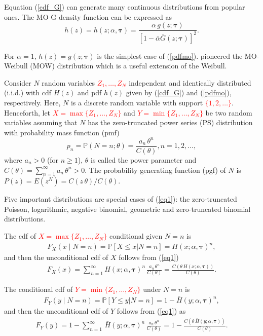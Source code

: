 \documentclass[12pt]{article}
\begin{document}
Equation (\ref{cdf_G}) can generate many continuous distributions from popular ones.
The MO-G density function can be expressed as
\begin{equation}\label{pdfmo}
h(z)=h(z;\alpha,\bm{\tau})=\frac{\alpha\, g(z;\bm{\tau})}{[1-\bar{\alpha}\bar{G}(z;\bm{\tau})]^2}.
\end{equation}

For $\alpha=1$, $h(z)=g(z;\bm{\tau})$ is the simplest case of (\ref{pdfmo}).
\cite{MarshallOlkin1997} pioneered the MO-Weibull (MOW) distribution which is a useful extension of the Weibull.

Consider $N$ random va\-riables \textcolor{red}{$Z_1,\ldots,Z_N$} independent and identically distributed (i.i.d.) with cdf $H(z)$ and pdf $h(z)$ given by (\ref{cdf_G}) and (\ref{pdfmo}), respectively. Here, $N$ is a discrete random va\-riable with
support \textcolor{red}{$\{1,2,\ldots\}$}. Henceforth, let \textcolor{red}{$X=\max\{Z_1,\ldots, Z_N\}$} and \textcolor{red}{$Y=\min\{Z_1,\ldots, Z_N\}$} be two random variables
assuming that $N$ has the zero-truncated power series (PS) distribution with probability mass function (pmf)
\begin{equation}\label{eq1}
p_n=\mathbb{P}(N=n;\theta) =\frac{a_n\,\theta^n}{C(\theta)}, n=1,2,\ldots,
\end{equation}
where $a_n>0$ (for $n \ge1$), $\theta$ is called the power parameter and
$C(\theta)=\sum_{n=1}^{\infty}a_n\,\theta^n>0$. The probability generating function (pgf) of $N$ is $P(z)=E(z^N)=C(z\,\theta)/C(\theta)$.

Five important distributions are special cases of (\ref{eq1}): the zero-truncated Poisson,
logarithmic, ne\-gative binomial, geometric and zero-truncated binomial distributions.


The cdf of \textcolor{red}{$X=\max\{Z_1,\ldots, Z_N\}$} conditional given $N=n$ is
\begin{eqnarray*}
F_X(x\mid N=n)=\mathbb{P}\left[X \le x|N=n\right]=H(x;\alpha,\bm{\tau})^{n},
\end{eqnarray*}
and then the unconditional cdf of $X$ follows from (\ref{eq1})
\begin{eqnarray}\label{ucdfmax}
F_X(x)=\sum_{n=1}^{\infty} H(x;\alpha,\bm{\tau})^{n}\,\frac{a_n\,\theta^n}{C(\theta)}=
\frac{C\left(\theta\,H(x;\alpha,\bm{\tau})\right)}{C(\theta)}.
\end{eqnarray}

The conditional cdf of \textcolor{red}{$Y=\min\{Z_1,\ldots,Z_N\}$} under $N=n$ is
\begin{eqnarray*}
F_Y(y\mid N=n)=\mathbb{P}\left[Y \le y|N=n\right]=1-\bar{H}(y;\alpha,\bm{\tau})^{n},
\end{eqnarray*}
and then the unconditional cdf of $Y$ follows from (\ref{eq1}) as
\begin{eqnarray}\label{ucdfmin}
F_Y(y)=1-\sum_{n=1}^{\infty}\,\bar{H}(y;\alpha,\bm{\tau})^{n}\,\frac{a_n\,\theta^n}{C(\theta)}=1-\frac{C\left(\theta\,\bar{H}(y;\alpha,\bm{\tau})\right)}{C(\theta)}.
\end{eqnarray}
\end{document}
